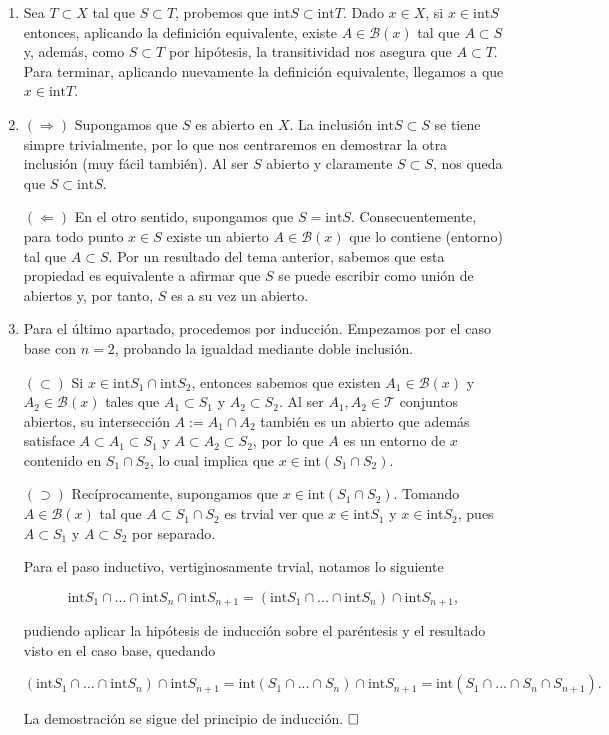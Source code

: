 \documentclass{article}
\begin{document}
\begin{enumerate}[label=(\textit{\roman*})]
    \item  Sea $T \subset X$ tal que $S \subset T$, probemos que $\text{int}S \subset \text{int}T$. Dado $x \in X$, si $x \in \text{int}S$ entonces, aplicando la definición equivalente, existe $A \in \mathcal{B}(x)$ tal que $A \subset S$ y, además, como $S \subset T$ por hipótesis, la transitividad nos asegura que $A \subset T$. Para terminar, aplicando nuevamente la definición equivalente, llegamos a que $x \in \text{int}T$.

    \item $(\Longrightarrow)$ Supongamos que $S$ es abierto en $X$. La inclusión $\text{int}S \subset S$ se tiene simpre trivialmente, por lo que nos centraremos en demostrar la otra inclusión (muy fácil también). Al ser $S$ abierto y claramente $S \subset S$, nos queda que $S \subset \text{int}S$.

    $(\Longleftarrow)$ En el otro sentido, supongamos que $S = \text{int}S$. Consecuentemente, para todo punto $x \in S$ existe un abierto $A \in \mathcal{B}(x)$ que lo contiene (entorno) tal que $A \subset S$. Por un resultado del tema anterior, sabemos que esta propiedad es equivalente a afirmar que $S$ se puede escribir como unión de abiertos y, por tanto, $S$ es a su vez un abierto. 

    \item Para el último apartado, procedemos por inducción. Empezamos por el caso base con $n = 2$, probando la igualdad mediante doble inclusión.

    $(\subset)$ Si $x \in \text{int}S_1 \cap \text{int}S_2$, entonces sabemos que existen $A_1 \in \mathcal{B}(x)$ y $A_2 \in \mathcal{B}(x)$ tales que $A_1 \subset S_1$ y $A_2 \subset S_2$. Al ser $A_1, A_2 \in \mathcal{T}$ conjuntos abiertos, su intersección $A := A_1 \cap A_2$ también es un abierto que además satisface $A \subset A_1 \subset S_1$ y $A \subset A_2 \subset S_2$, por lo que $A$ es un entorno de $x$ contenido en $S_1 \cap S_2$, lo cual implica que $x \in \text{int}(S_1 \cap S_2)$.

    $(\supset)$ Recíprocamente, supongamos que $x \in \text{int}(S_1 \cap S_2)$. Tomando $A \in \mathcal{B}(x)$ tal que $A \subset S_1 \cap S_2$ es trvial ver que $x \in \text{int}S_1$ y $x \in \text{int}S_2$, pues $A \subset S_1$ y $A \subset S_2$ por separado.

    Para el paso inductivo, vertiginosamente trvial, notamos lo siguiente

    \[\text{int}S_1 \cap ... \cap \text{int}S_n \cap \text{int}S_{n + 1} = (\text{int}S_1 \cap ... \cap \text{int}S_n) \cap \text{int}S_{n + 1},\]

    pudiendo aplicar la hipótesis de inducción sobre el paréntesis y el resultado visto en el caso base, quedando

    \[(\text{int}S_1 \cap ... \cap \text{int}S_n) \cap \text{int}S_{n + 1} = \text{int}(S_1 \cap ... \cap S_n) \cap \text{int}S_{n + 1} = \text{int}(S_1 \cap ... \cap S_n \cap S_{n + 1}).\]

    La demostración se sigue del principio de inducción. $\hfill\square$
    
\end{enumerate}
\end{document}
